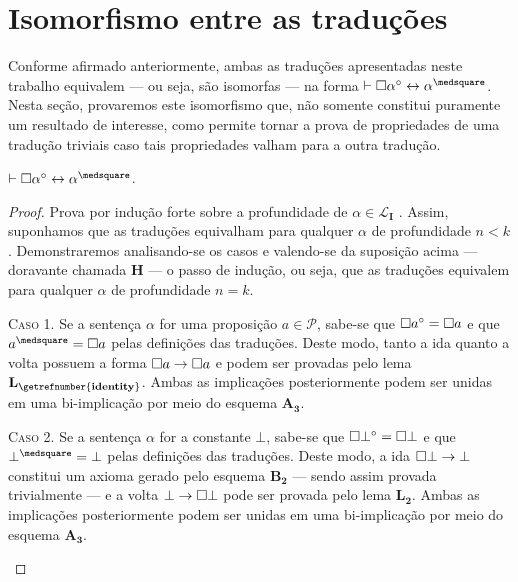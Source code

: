 \section{Isomorfismo entre as traduções}

Conforme afirmado anteriormente, ambas as traduções apresentadas neste trabalho equivalem --- ou seja, são isomorfas --- na forma $\entails\nec\alpha^\circ\leftrightarrow\alpha^\medsquare$. Nesta seção, provaremos este isomorfismo que, não somente constitui puramente um resultado de interesse, como permite tornar a prova de propriedades de uma tradução triviais caso tais propriedades valham para a outra tradução.

\begin{theorem}\label{isomorphism}
    $\entails\nec\alpha^\circ\leftrightarrow\alpha^\medsquare$.

    \begin{proof}
        Prova por indução forte sobre a profundidade de $\alpha\in\mathcal{L}_\mathbf{I}$ \citep{Troelstra}.
        Assim, suponhamos que as traduções equivalham para qualquer $\alpha$ de profundidade $n<k$.
        Demonstraremos analisando-se os casos e valendo-se da suposição acima --- doravante chamada $\mathbf{H}$ --- o passo de indução, ou seja, que as traduções equivalem para qualquer $\alpha$ de profundidade $n=k$.

        \begin{case}
            \textsc{Caso 1.}
            Se a sentença $\alpha$ for uma proposição $a\in\mathcal{P}$, sabe-se que $\Box a^\circ=\Box a$ e que $a^\medsquare=\nec a$ pelas definições das traduções.
            Deste modo, tanto a ida quanto a volta possuem a forma $\Box a\to\Box a$ e podem ser provadas pelo lema \hyperref[identity]{$\mathbf{L_\getrefnumber{identity}}$}.
            Ambas as implicações posteriormente podem ser unidas em uma bi-implicação por meio do esquema \hyperref[MA3]{$\mathbf{A_3}$}.
        \end{case}

        \begin{case}
            \textsc{Caso 2.}
            Se a sentença $\alpha$ for a constante $\bot$, sabe-se que $\Box\bot^\circ=\Box\bot$ e que $\bot^\medsquare=\bot$ pelas definições das traduções.
            Deste modo, a ida $\Box\bot\to\bot$ constitui um axioma gerado pelo esquema \hyperref[MB2]{$\mathbf{B_2}$} --- sendo assim provada trivialmente --- e a volta $\bot\to\Box\bot$ pode ser provada pelo lema \hyperref[explosion]{$\mathbf{L_2}$}.
            Ambas as implicações posteriormente podem ser unidas em uma bi-implicação por meio do esquema \hyperref[MA3]{$\mathbf{A_3}$}.
        \end{case}


\end{proof}
\end{theorem}
